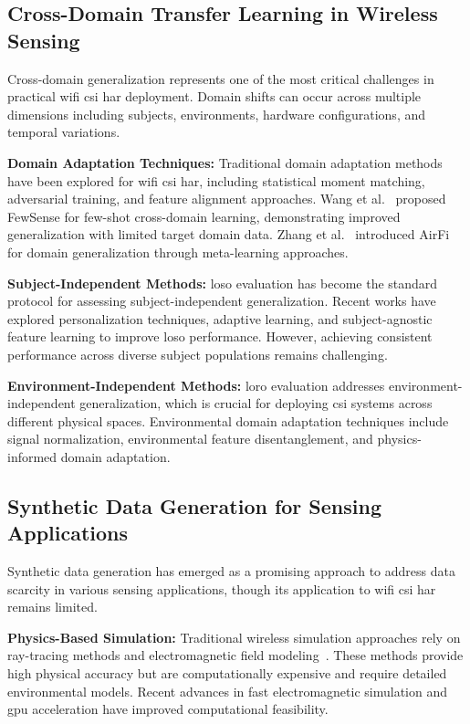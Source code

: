 \documentclass[journal]{IEEEtran}
\begin{document}
\subsection{Cross-Domain Transfer Learning in Wireless Sensing}

Cross-domain generalization represents one of the most critical challenges in practical \gls{wifi} \gls{csi} \gls{har} deployment. Domain shifts can occur across multiple dimensions including subjects, environments, hardware configurations, and temporal variations.

\textbf{Domain Adaptation Techniques:} Traditional domain adaptation methods have been explored for \gls{wifi} \gls{csi} \gls{har}, including statistical moment matching, adversarial training, and feature alignment approaches. Wang et al.~\cite{fewsense2022} proposed FewSense for few-shot cross-domain learning, demonstrating improved generalization with limited target domain data. Zhang et al.~\cite{airfi2022} introduced AirFi for domain generalization through meta-learning approaches.

\textbf{Subject-Independent Methods:} \gls{loso} evaluation has become the standard protocol for assessing subject-independent generalization. Recent works have explored personalization techniques, adaptive learning, and subject-agnostic feature learning to improve \gls{loso} performance. However, achieving consistent performance across diverse subject populations remains challenging.

\textbf{Environment-Independent Methods:} \gls{loro} evaluation addresses environment-independent generalization, which is crucial for deploying \gls{csi} systems across different physical spaces. Environmental domain adaptation techniques include signal normalization, environmental feature disentanglement, and physics-informed domain adaptation.

\subsection{Synthetic Data Generation for Sensing Applications}

Synthetic data generation has emerged as a promising approach to address data scarcity in various sensing applications, though its application to \gls{wifi} \gls{csi} \gls{har} remains limited.

\textbf{Physics-Based Simulation:} Traditional wireless simulation approaches rely on ray-tracing methods and electromagnetic field modeling~\cite{ray_tracing_wireless2000}. These methods provide high physical accuracy but are computationally expensive and require detailed environmental models. Recent advances in fast electromagnetic simulation and \gls{gpu} acceleration have improved computational feasibility.
\end{document}
